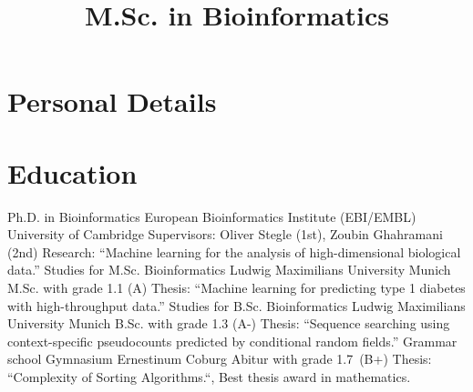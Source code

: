 \documentclass[11pt,a4paper]{moderncv}
\title{M.Sc. in Bioinformatics}
\begin{document}
\maketitle

\section{Personal Details}

\section{Education}
         {Ph.D. in Bioinformatics}
         {European Bioinformatics Institute (EBI/EMBL)}
         {University of Cambridge}
         {Supervisors: Oliver Stegle (1st), Zoubin Ghahramani (2nd)}
         {Research: ``Machine learning for the analysis of high-dimensional
           biological data.''}
         {Studies for M.Sc. Bioinformatics}
         {Ludwig Maximilians University}
         {Munich}
         {\hfill\break M.Sc. with grade 1.1 (A)}
         {Thesis: ``Machine learning for predicting type 1 diabetes with
           high-throughput data.''}
         {Studies for B.Sc. Bioinformatics}
         {Ludwig Maximilians University}
         {Munich}
         {\hfill\break B.Sc. with grade 1.3 (A-)}
         {Thesis: ``Sequence searching using context-specific pseudocounts
           predicted by conditional random fields.''}
         {Grammar school}
         {Gymnasium Ernestinum}
         {Coburg}
         {\hfill\break Abitur with grade 1.7~(B+)}
         {Thesis: ``Complexity of Sorting Algorithms.``, Best thesis award in
           mathematics.}
\end{document}
